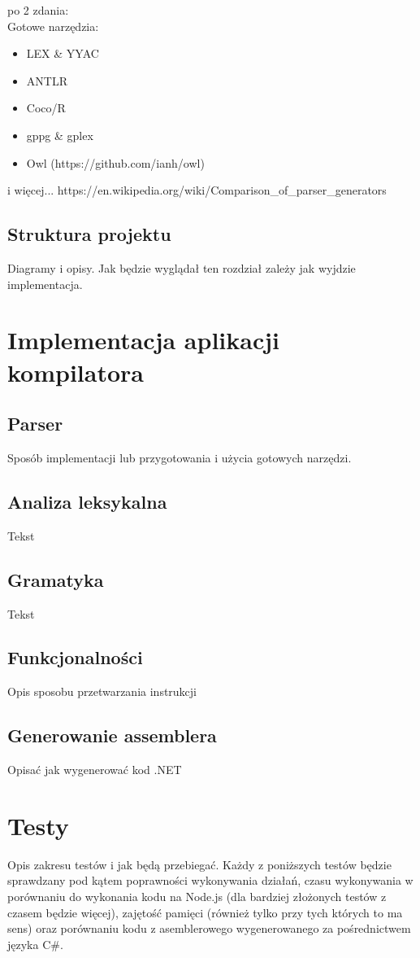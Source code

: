 \documentclass[a4paper]{article}
\begin{document}
po 2 zdania: \\
Gotowe narzędzia:
\begin{itemize}
  \item LEX \& YYAC
  \item ANTLR
  \item Coco/R
  \item gppg \& gplex
  \item Owl (https://github.com/ianh/owl)
\end{itemize}
i więcej... https://en.wikipedia.org/wiki/Comparison\_of\_parser\_generators


\subsection{Struktura projektu}
Diagramy i opisy.
Jak będzie wyglądał ten rozdział zależy jak wyjdzie implementacja.

\section{Implementacja aplikacji kompilatora}
\subsection{Parser}
Sposób implementacji lub przygotowania i użycia gotowych narzędzi.

\subsection{Analiza leksykalna}
Tekst
\subsection{Gramatyka}
Tekst
\subsection{Funkcjonalności}
Opis sposobu przetwarzania instrukcji
\subsection{Generowanie assemblera}
Opisać jak wygenerować kod .NET

\section{Testy}
Opis zakresu testów i jak będą przebiegać.
Każdy z poniższych testów będzie sprawdzany pod kątem poprawności wykonywania działań, czasu wykonywania w porównaniu do wykonania kodu na Node.js (dla bardziej złożonych testów z czasem będzie więcej), zajętość pamięci (również tylko przy tych których to ma sens) oraz porównaniu kodu z asemblerowego wygenerowanego za pośrednictwem języka C\#.
\end{document}
